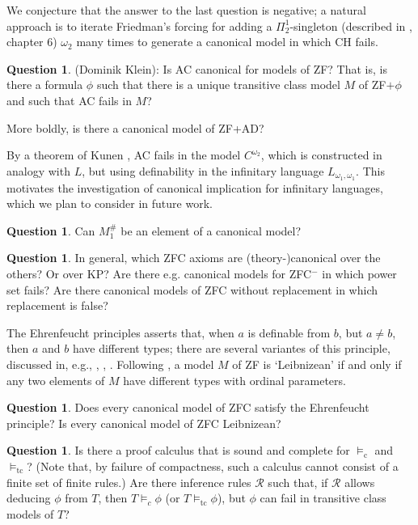 \documentclass[a4paper,12pt]{amsart}
\theoremstyle{definition}
\newtheorem{question}[fact]{Question}
\begin{document}
We conjecture that the answer to the last question is negative; a natural approach is to iterate Friedman's forcing for adding a $\Pi^{1}_{2}$-singleton (described in \cite{Fr}, chapter $6$) $\omega_2$ many times to generate a canonical model in which CH fails. 




\begin{question}
(Dominik Klein): Is AC canonical for models of ZF? That is, is there a formula $\phi$ such that there is a unique transitive class model $M$ of ZF$+\phi$ and such that AC fails in $M$? 

More boldly, is there a canonical model of ZF+AD?

\end{question}


By a theorem of Kunen \cite{Kunen}, AC fails in the model $C^{\omega_2}$, which is constructed in analogy with $L$, but using definability in the infinitary language $L_{\omega_{1},\omega_{1}}$. This motivates the investigation of canonical implication for infinitary languages, which we plan to consider in future work. 


\begin{question}
Can $M_1^\#$ be an element of a canonical model? 

\end{question}

\begin{question}
In general, which ZFC axioms are (theory-)canonical over the others? Or over KP? Are there e.g. canonical models for ZFC$^{-}$ in which power set fails? Are there canonical models of ZFC without replacement in which replacement is false?
\end{question}



The Ehrenfeucht principles asserts that, when $a$ is definable from $b$, but $a\neq b$, then $a$ and $b$ have different types; there are several variantes of this principle, discussed in, e.g., \cite{Enayat}, \cite{Mycielski}, \cite{FGH}. 
 Following \cite{Enayat1}, a model $M$ of ZF is `Leibnizean' if and only if any two elements of $M$ have different types with ordinal parameters.
 
 \begin{question}
 Does every canonical model of ZFC satisfy the Ehrenfeucht principle? Is every canonical model of ZFC Leibnizean?
 \end{question}


\begin{question}
Is there a proof calculus that is sound and complete for $\models_{\text{c}}$ and $\models_{\text{tc}}$? (Note that, by failure of compactness, such a calculus cannot consist of a finite set of finite rules.) 
Are there inference rules $\mathcal{R}$ such that, if $\mathcal{R}$ allows deducing $\phi$ from $T$, then $T\models_{c}\phi$ (or $T\models_{\text{tc}}\phi$), but $\phi$ can fail in transitive class models of $T$?
\end{question}
\end{document}
